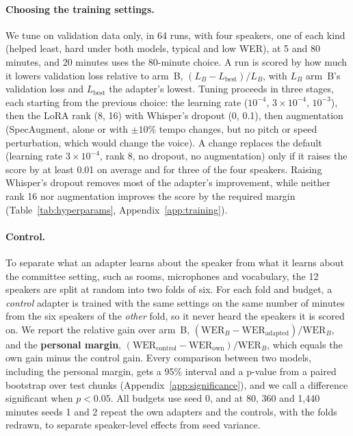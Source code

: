 \documentclass[11pt]{article}
\begin{document}
\paragraph{Choosing the training settings.}
We tune on validation data only, in 64 runs, with four speakers, one of each
kind (helped least, hard under both models, typical and low WER), at 5 and 80
minutes, and 20 minutes uses the 80-minute choice. A run is scored by how much
it lowers validation loss relative to arm~B, $(L_B - L_\text{best})/L_B$, with $L_B$
arm~B's validation loss and $L_\text{best}$ the adapter's lowest. Tuning proceeds in three stages,
each starting from the previous choice: the learning rate ($10^{-4}$,
$3\times10^{-4}$, $10^{-3}$), then the LoRA rank (8, 16) with Whisper's dropout
(0, 0.1), then augmentation (SpecAugment, alone or with $\pm10\%$ tempo changes,
but no pitch or speed perturbation, which would change the voice).
A change replaces the default (learning rate $3\times10^{-4}$, rank 8, no dropout,
no augmentation) only if it raises the score by at least 0.01 on average and for
three of the four speakers. Raising Whisper's dropout removes most of the
adapter's improvement, while neither rank 16 nor augmentation improves the score
by the required margin (Table~\ref{tab:hyperparams}, Appendix~\ref{app:training}).

\paragraph{Control.}
To separate what an adapter learns about the speaker from what it learns about
the committee setting, such as rooms, microphones and vocabulary, the 12 speakers are split at random into two folds of six. For
each fold and budget, a \emph{control} adapter is trained with the same settings
on the same number of minutes from the six speakers of the \emph{other} fold,
so it never heard the speakers it is scored on.
 We report the relative gain over
arm~B, $(\text{WER}_B-\text{WER}_\text{adapted})/\text{WER}_B$, and the
\textbf{personal margin},
$(\text{WER}_\text{control}-\text{WER}_\text{own})/\text{WER}_B$, which equals
the own gain minus the control gain. Every comparison between two models, including the
personal margin, gets a 95\% interval and a p-value from a paired bootstrap over
test chunks (Appendix~\ref{app:significance}), and we call a difference
significant when $p<0.05$. All
budgets use seed 0, and at 80, 360 and 1{,}440 minutes seeds 1 and 2 repeat the own adapters and
the controls, with the folds redrawn, to separate speaker-level effects from
seed variance.
\end{document}
